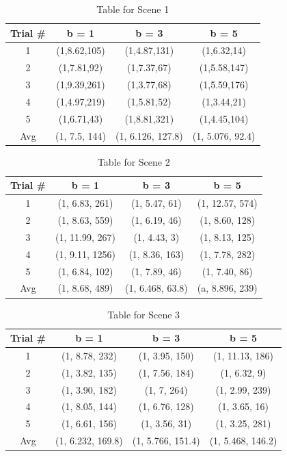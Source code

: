 \documentclass{article}
\begin{document}
\begin{table}[h!]
  \centering
\begin{tabular}{|c|c|c|c|}
  \hline
  Trial \# & b = 1 & b = 3 & b = 5 \\
  \hline
  1 & (1,8.62,105) & (1,4.87,131) & (1,6.32,14) \\
  2 & (1,7.81,92) & (1,7.37,67) & (1,5.58,147) \\
  3 & (1,9.39,261) & (1,3.77,68) & (1,5.59,176) \\
  4 & (1,4.97,219) & (1,5.81,52) & (1,3.44,21) \\
  5 & (1,6.71,43) & (1,8.81,321) & (1,4.45,104) \\
  Avg & (1, 7.5, 144) & (1, 6.126, 127.8) & (1, 5.076, 92.4)\\
  \hline
\end{tabular} 
\caption{Table for Scene 1}
  \label{tab:mytable}
\end{table}

\begin{table}[h!]
  \centering
\begin{tabular}{|c|c|c|c|}
  \hline
  Trial \# & b = 1 & b = 3 & b = 5 \\
  \hline
  1 & (1, 6.83, 261) & (1, 5.47, 61) & (1, 12.57, 574) \\
  2 & (1, 8.63, 559) & (1, 6.19, 46) & (1, 8.60, 128) \\
  3 & (1, 11.99, 267) & (1, 4.43, 3) & (1, 8.13, 125) \\
  4 & (1, 9.11, 1256) & (1, 8.36, 163) & (1, 7.78, 282) \\
  5 & (1, 6.84, 102) & (1, 7.89, 46) & (1, 7.40, 86) \\
  Avg & (1, 8.68, 489) & (1, 6.468, 63.8) & (a, 8.896, 239) \\
  \hline
\end{tabular} 
\caption{Table for Scene 2}
  \label{tab:mytable}
\end{table}

\begin{table}[h!]
  \centering
\begin{tabular}{|c|c|c|c|}
  \hline
  Trial \# & b = 1 & b = 3 & b = 5 \\
  \hline
  1 & (1, 8.78, 232) & (1, 3.95, 150) & (1, 11.13, 186) \\
  2 & (1, 3.82, 135) & (1, 7.56, 184) & (1, 6.32, 9) \\
  3 & (1, 3.90, 182) & (1, 7, 264) & (1, 2.99, 239) \\
  4 & (1, 8.05, 144) & (1, 6.76, 128) & (1, 3.65, 16) \\
  5 & (1, 6.61, 156) & (1, 3.56, 31) & (1, 3.25, 281) \\
  Avg & (1, 6.232, 169.8) & (1, 5.766, 151.4) & (1, 5.468, 146.2) \\
  \hline
\end{tabular} 
\caption{Table for Scene 3}
  \label{tab:mytable}
\end{table}
\end{document}
